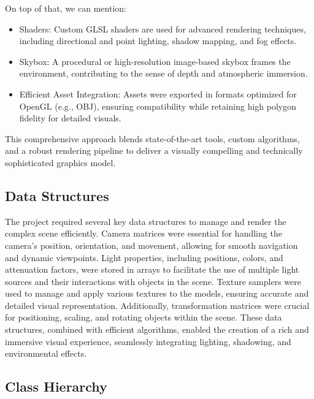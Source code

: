 \documentclass[12pt]{article}
\begin{document}
	On top of that, we can mention:
	
	\begin{itemize}
	\item  Shaders: Custom GLSL shaders are used for advanced rendering techniques, including directional and point lighting, shadow mapping, and fog effects.
	\item  Skybox: A procedural or high-resolution image-based skybox frames the environment, contributing to the sense of depth and atmospheric immersion.
	\item  Efficient Asset Integration: Assets were exported in formats optimized for OpenGL (e.g., OBJ), ensuring compatibility while retaining high polygon fidelity for detailed visuals.
	\end{itemize}
	
	This comprehensive approach blends state-of-the-art tools, custom algorithms, and a robust rendering pipeline to deliver a visually compelling and technically sophisticated graphics model.
	
	\subsection{Data Structures}
	The project required several key data structures to manage and render the complex scene efficiently. Camera matrices were essential for handling the camera's position, orientation, and movement, allowing for smooth navigation and dynamic viewpoints. Light properties, including positions, colors, and attenuation factors, were stored in arrays to facilitate the use of multiple light sources and their interactions with objects in the scene. Texture samplers were used to manage and apply various textures to the models, ensuring accurate and detailed visual representation. Additionally, transformation matrices were crucial for positioning, scaling, and rotating objects within the scene. These data structures, combined with efficient algorithms, enabled the creation of a rich and immersive visual experience, seamlessly integrating lighting, shadowing, and environmental effects.
	
	
	\subsection{Class Hierarchy}
\end{document}
